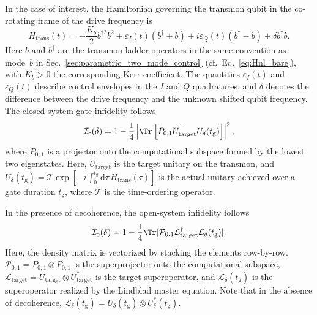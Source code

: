 In the case of interest, the Hamiltonian governing the transmon qubit in the co-rotating frame of the drive frequency is 
\begin{equation}
\label{eq:H_trans}
    H_\text{trans}(t) = -\frac{K_b}{2} b^{\dagger 2} b^2 + \varepsilon_I(t)(b^\dagger+b)+i\varepsilon_Q(t)(b^\dagger-b)+\delta b^\dagger b.
\end{equation}
Here $b$ and $b^\dagger$ are the transmon ladder operators in the same convention as mode~$b$ in Sec.~\ref{sec:parametric_two_mode_control} (cf.\ Eq.~\eqref{eq:Hnl_bare}), with $K_b>0$ the corresponding Kerr coefficient. The quantities $\varepsilon_I(t)$ and $\varepsilon_Q(t)$ describe control envelopes in the $I$ and $Q$ quadratures, and $\delta$ denotes the difference between the drive frequency and the unknown shifted qubit frequency.%
%
%
The closed-system gate infidelity follows 
\begin{equation}\label{eq:fid_single}
\mathcal{I}_\text{c}(\delta) = 1-\frac{1}{4}\left|\Tr\left[P_{0,1}U_\text{target}^\dagger U_\delta(t_\text{g})\right]\right|^2,
\end{equation}
where $P_{0,1}$ is a projector onto the computational subspace formed by the lowest two eigenstates. Here, $U_\text{target}$ is the target unitary on the transmon, and $U_\delta(t_\text{g})=\mathcal{T}\exp[-i\int_0^{t_\text{g}} \mathrm{d}\tau \, H_\text{trans}(\tau)]$ is the actual unitary achieved over a gate duration $t_\text{g}$, where $\mathcal{T}$ is the time-ordering operator. 

In the presence of decoherence, the open-system infidelity follows~\cite{abdelhafez2019quantumthesis}
\begin{equation}
\label{eq:open_inf}
\mathcal{I}_\text{o}(\delta) = 1-\frac{1}{4}\Tr[\mathcal{P}_{0,1}\mathcal{L}_\text{target}^\dagger \mathcal{L}_\delta(t_\text{g})].
\end{equation}
Here, the density matrix is vectorized by stacking the elements row-by-row. $\mathcal{P}_{0,1}=P_{0,1}\otimes P_{0,1}$ is the superprojector onto the computational subspace, $\mathcal{L}_\text{target}=U_\text{target}\otimes U^*_\text{target}$ is the target superoperator, and $\mathcal{L}_\delta(t_\text{g})$ is the superoperator realized by the Lindblad master equation. Note that in the absence of decoherence, $\mathcal{L}_\delta(t_\text{g})=U_\delta(t_\text{g})\otimes U_\delta^*(t_\text{g})$.

